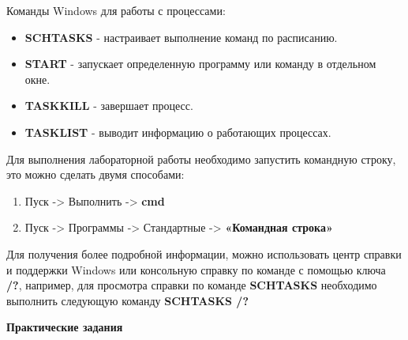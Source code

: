 \documentclass[a4paper,12pt]{article}
\begin{document}
  
  \begin{flushleft}
    Команды Windows для работы с процессами:
    \begin{itemize}
     \item {\bf SCHTASKS} - настраивает выполнение команд по расписанию.
     \item {\bf START} - запускает определенную программу или команду в отдельном окне.
     \item {\bf TASKKILL} - завершает процесс.
     \item {\bf TASKLIST} - выводит информацию о работающих процессах.
    \end{itemize}
  \end{flushleft}
  

  \begin{flushleft}
    Для выполнения лабораторной работы необходимо запустить командную строку, это можно сделать двумя способами:
    \begin{flushleft}
        \begin{enumerate} [1. ]
        \item Пуск -> Выполнить -> {\bf cmd}
        \item Пуск -> Программы -> Стандартные -> {\bf «Командная строка»} \\[0.4cm]
        \end{enumerate}
    \end{flushleft}
  \end{flushleft}

  \begin{flushleft}
  Для получения более подробной информации, можно использовать центр справки и поддержки Windows или консольную справку по команде с помощью ключа {\bf /?}, например, для просмотра справки по команде {\bf SCHTASKS} необходимо выполнить следующую команду {\bf SCHTASKS /?}\\[0.2cm]
  \end{flushleft}

  \newpage

  \begin{center}
    {\bf Практические задания}
  \end{center}
\end{document}
